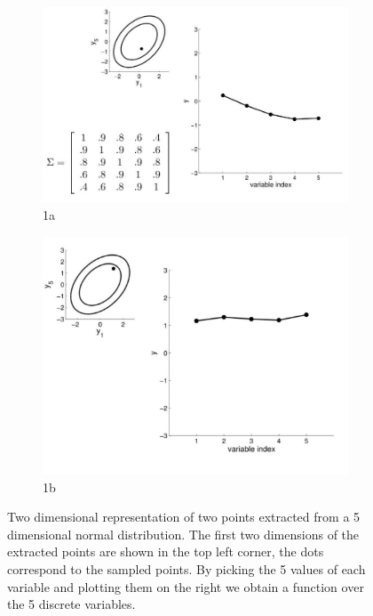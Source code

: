 \documentclass{article}
\begin{document}
\begin{figure}
    \begin{subfigure}{.5\textwidth}
      \centering
      \includegraphics[width=\linewidth]{gauss5d1.jpg}
      \caption{1a}
      \label{fig:sfig1}
    \end{subfigure}%
    \begin{subfigure}{.5\textwidth}
      \centering
      \includegraphics[width=\linewidth]{gauss5d2.jpg}
      \caption{1b}
      \label{fig:sfig2}
    \end{subfigure}
    \caption{Two dimensional representation of two points extracted from a 5 dimensional normal distribution. The first two dimensions of the extracted points are shown in the top left corner, the dots correspond to the sampled points. By picking the 5 values of each variable and plotting them on the right we obtain a function over the 5 discrete variables.}
    \label{example}
\end{figure}
\end{document}
